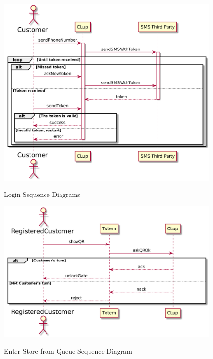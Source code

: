 \begin{figure}[H]
    \centering
    \includegraphics[width=1\textwidth]{uml/login.png}
    \label{fig:seqdiag-login}
    \caption{Login Sequence Diagrams}
\end{figure}

\begin{figure}[H]
    \centering
    \includegraphics[width=1\textwidth]{uml/enter_queue.png}
    \label{fig:seqdiag-enter_queue}
    \caption{Enter Store from Queue Sequence Diagram}
\end{figure}

